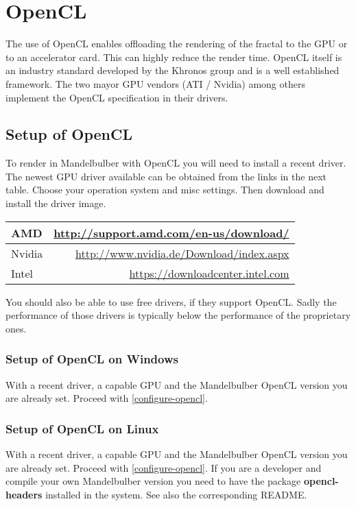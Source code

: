 

\section{OpenCL}\label{opencl}

The use of OpenCL enables offloading the rendering of the fractal to the
GPU or to an accelerator card. This can highly reduce the render time.
OpenCL itself is an industry standard developed by the Khronos group and
is a well established framework. The two mayor GPU vendors (ATI / Nvidia)
among others implement the OpenCL specification in their drivers.

\subsection{Setup of OpenCL}\label{setup-opencl}
To render in Mandelbulber with OpenCL you will need to install a recent driver.
The newest GPU driver available can be obtained from the links in the next table.
Choose your operation system and misc settings.
Then download and install the driver image.

\begin{center}
	\begin{tabular}{ | l | r | }
		\hline
		AMD 	&
		\href{http://support.amd.com/en-us/download/}{http://support.amd.com/en-us/download/}
		\\ \hline
		Nvidia 	& 
		\href{http://www.nvidia.de/Download/index.aspx}{http://www.nvidia.de/Download/index.aspx}
		\\ \hline
		Intel	&
		\href{https://downloadcenter.intel.com}{https://downloadcenter.intel.com}
		\\ \hline
	\end{tabular}
\end{center}

You should also be able to use free drivers, if they support OpenCL.
Sadly the performance of those drivers is typically below the performance of the proprietary ones.

\subsubsection{Setup of OpenCL on Windows}\label{setup-opencl-windows}
With a recent driver, a capable GPU and the Mandelbulber OpenCL version you are already set.
Proceed with \ref{configure-opencl}.

\subsubsection{Setup of OpenCL on Linux}\label{setup-opencl-linux}
With a recent driver, a capable GPU and the Mandelbulber OpenCL version you are already set.
Proceed with \ref{configure-opencl}. 
If you are a developer and compile your own Mandelbulber version
you need to have the package \textbf{opencl-headers} installed in the system.  
See also the corresponding README.

